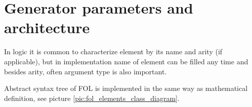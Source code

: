 \chapter{Generator parameters and architecture}

In logic it is common to characterize element by its name and arity (if applicable), but in implementation name of element can be filled any time and besides arity, often argument type is also important. 


%

Abstract syntax tree of \gls{FOL} is implemented in the same way as mathematical definition, see picture \ref{pic:fol_elements_class_diagram}.

